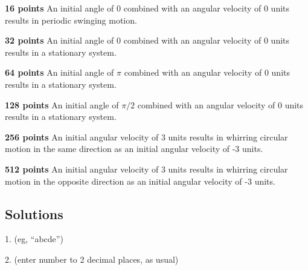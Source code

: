\textbf{16 points} An initial angle of $0$ combined with an angular velocity of 0 units results in periodic swinging motion.

\textbf{32 points} An initial angle of $0$ combined with an angular velocity of 0 units results in a stationary system.

\textbf{64 points} An initial angle of $\pi$ combined with an angular velocity of 0 units results in a stationary system.

\textbf{128 points} An initial angle of $\pi/2$ combined with an angular velocity of 0 units results in a stationary system.

\textbf{256 points} An initial angular velocity of 3 units results in whirring circular motion in the same direction as an initial angular velocity of -3 units.

\textbf{512 points} An initial angular velocity of 3 units results in whirring circular motion in the opposite direction as an initial angular velocity of -3 units.

\subsection*{Solutions}

1. (eg, ``abcde'') 


2. (enter number to 2 decimal places, as usual) 


\fi
